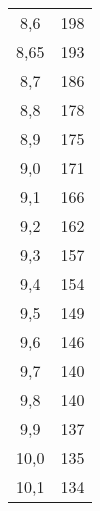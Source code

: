 \begin{longtable}{cc}
8,6  &198\\
8,65 & 193\\
8,7  & 186\\
8,8  & 178\\
8,9  & 175\\
9,0  & 171\\
9,1  & 166\\
9,2  & 162\\
9,3  & 157\\
9,4  & 154\\
9,5  & 149\\
9,6  & 146\\
9,7  & 140\\
9,8  & 140\\
9,9  & 137\\
10,0 & 135\\
10,1 & 134\\
\end{longtable}
